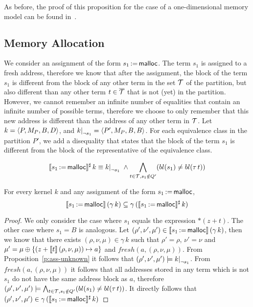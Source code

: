As before, the proof of this proposition for the case of a one-dimensional memory model can be found in~\cite{2pointer}.

\subsection{Memory Allocation}

We consider an assignment of the form $s_1\,{:=}\,\textsf{malloc}$.
The term $s_1$ is assigned to a fresh address, therefore we know that after the assignment,
the block of the term $s_1$ is different from the block of any other term in the set $\mathcal{T}$ of the partition,
but also different than any other term $t \in {\overline{\mathcal{T}}}$ that is not (yet) in the partition.
However, we cannot remember an infinite number of equalities that contain an infinite number of possible terms,
therefore we choose to only remember that this new address is different than the address of any other term in $\mathcal{T}$.
Let $k = \langle P, M_P, B,D\rangle$, and $\restr{k}{\neg s_1} = \angl{P', M_P, B, B}$.
For each equivalence class in the partition $P'$, we add a disequality that states
that the block of the term $s_1$ is different from the block of the representative of the equivalence class.

\[
	\sem{s_1\,{:=}\,\text{\malloc}}^\sharp\,k \equiv
	\restr{k}{\neg s_1}\;\land
	\bigwedge_{t\in \T,s_1\notin Q'}(bl(s_1) \neq bl(\tau\,t))
\]

\begin{proposition}\label{p:ass-malloc}
	For every kernel $k$ and any assignment of the form $s_1\,{:=}\,\textsf{malloc}$,
	\[
		\llbracket s_1\,{:=}\,\textsf{malloc}\rrbracket\,(\gamma\,k) \subseteq \gamma\,(\llbracket s_1\,{:=}\,\textsf{malloc}\rrbracket^\sharp\,k)
	\]
\end{proposition}

\begin{proof}
	We only consider the case where $s_1$ equals the expression $*(z+t)$.
	The other case where $s_1 = B$ is analogous.
	Let $(\rho',\nu',\mu') \in \llbracket s_1\,{:=}\,\textsf{malloc}\rrbracket\,(\gamma\,k)$, then we know that there exists $(\rho,\nu,\mu) \in \gamma\,k$ such that $\rho'=\rho$, $\nu'=\nu$ and $\mu' =\mu\oplus\{(z+\llbracket t\rrbracket\,(\rho,\nu,\mu))\mapsto a\}$ and $fresh(a, (\rho, \nu, \mu))$.
	From Proposition~\ref{p:ass-unknown} it follows that $(\rho',\nu',\mu') \models \restr{k}{\neg s_1}$.
	From $fresh(a,( \rho,\nu,\mu))$ it follows that all addresses stored in any term which is not $s_1$ do not have the same address block as $a$, therefore $(\rho',\nu',\mu') \models \bigwedge_{t\in \mathcal{T},s_1\notin Q'}(bl(s_1) \neq bl(\tau\,t))$.
	It directly follows that $(\rho',\nu',\mu') \in \gamma\,(\llbracket s_1\,{:=}\,\textsf{malloc}\rrbracket^\sharp\,k)$
\end{proof}
